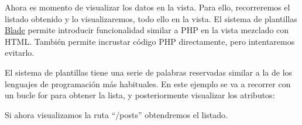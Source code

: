 
Ahora es momento de visualizar los datos en la vista. Para ello, recorreremos el listado obtenido y lo visualizaremos, todo ello en la vista. El sistema de plantillas \href{https://laravel.com/docs/10.x/blade}{Blade} permite introducir funcionalidad similar a PHP en la vista mezclado con HTML. También permite incrustar código PHP directamente, pero intentaremos evitarlo.

El sistema de plantillas tiene una serie de palabras reservadas similar a la de los lenguajes de programación más habituales. En este ejemplo se va a recorrer con un bucle for para obtener la lista, y posteriormente visualizar los atributos:


Si ahora visualizamos la ruta “/posts” obtendremos el listado.



